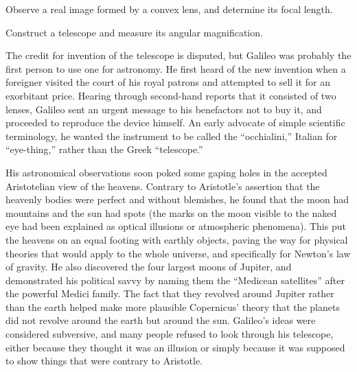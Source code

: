 \label{lab:geometric-optics}

\apparatus
{}

\begin{goals}

\item[] Observe a real image formed by a convex lens, and
determine its focal length.

\item[] Construct a telescope and measure its angular magnification.
\end{goals}

\introduction

The credit for invention of the telescope is disputed, but
Galileo was probably the first person to use one for
astronomy. He first heard of the new invention when a
foreigner visited the court of his royal patrons and
attempted to sell it for an exorbitant price. Hearing
through second-hand reports that it consisted of two lenses,
Galileo sent an urgent message to his benefactors not to buy
it, and proceeded to reproduce the device himself. An early
advocate of simple scientific terminology, he wanted the
instrument to be called the ``occhialini,'' Italian for
``eye-thing,'' rather than the Greek ``telescope.''

His astronomical observations soon poked some gaping holes
in the accepted Aristotelian view of the heavens. Contrary
to Aristotle's assertion that the heavenly bodies were
perfect and without blemishes, he found that the moon had
mountains and the sun had spots (the marks on the moon
visible to the naked eye had been explained as optical
illusions or atmospheric phenomena). This put the heavens on
an equal footing with earthly objects, paving the way for
physical theories that would apply to the whole universe,
and specifically for Newton's law of gravity. He also
discovered the four largest moons of Jupiter, and demonstrated
his political savvy by naming them the ``Medicean satellites''
after the powerful Medici family. The fact that they
revolved around Jupiter rather than the earth helped make
more plausible Copernicus' theory that the planets did not
revolve around the earth but around the sun. Galileo's ideas
were considered subversive, and many people refused to look
through his telescope, either because they thought it was an
illusion or simply because it was supposed to show things
that were contrary to Aristotle.


